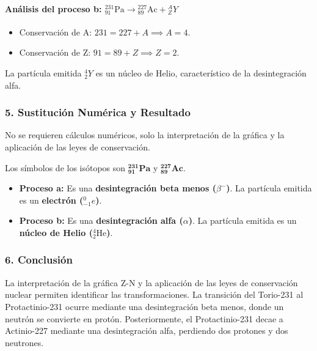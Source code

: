 \paragraph{Análisis del proceso b: ${}^{231}_{91}\text{Pa} \rightarrow {}^{227}_{89}\text{Ac} + {}^{A}_{Z}Y$}
\begin{itemize}
    \item Conservación de A: $231 = 227 + A \implies A=4$.
    \item Conservación de Z: $91 = 89 + Z \implies Z=2$.
\end{itemize}
La partícula emitida ${}^{4}_{2}Y$ es un núcleo de Helio, característico de la desintegración alfa.

\subsubsection*{5. Sustitución Numérica y Resultado}
No se requieren cálculos numéricos, solo la interpretación de la gráfica y la aplicación de las leyes de conservación.
\begin{cajaresultado}
Los símbolos de los isótopos son $\boldsymbol{{}^{231}_{91}\textbf{Pa}}$ y $\boldsymbol{{}^{227}_{89}\textbf{Ac}}$.
\begin{itemize}
    \item \textbf{Proceso a:} Es una \textbf{desintegración beta menos ($\beta^{-}$)}. La partícula emitida es un \textbf{electrón (${}^{0}_{-1}e$)}.
    \item \textbf{Proceso b:} Es una \textbf{desintegración alfa ($\alpha$)}. La partícula emitida es un \textbf{núcleo de Helio (${}^{4}_{2}\text{He}$)}.
\end{itemize}
\end{cajaresultado}

\subsubsection*{6. Conclusión}
\begin{cajaconclusion}
La interpretación de la gráfica Z-N y la aplicación de las leyes de conservación nuclear permiten identificar las transformaciones. La transición del Torio-231 al Protactinio-231 ocurre mediante una desintegración beta menos, donde un neutrón se convierte en protón. Posteriormente, el Protactinio-231 decae a Actinio-227 mediante una desintegración alfa, perdiendo dos protones y dos neutrones.
\end{cajaconclusion}

\newpage


